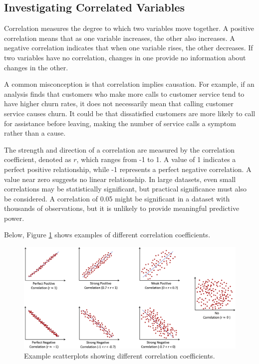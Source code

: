 \documentclass[
  11pt,
]{book}
\theoremstyle{definition}
\theoremstyle{definition}
\theoremstyle{definition}
\theoremstyle{definition}
\theoremstyle{remark}
\begin{document}
\subsection{Investigating Correlated Variables}\label{investigating-correlated-variables}

Correlation measures the degree to which two variables move together. A positive correlation means that as one variable increases, the other also increases. A negative correlation indicates that when one variable rises, the other decreases. If two variables have no correlation, changes in one provide no information about changes in the other.

A common misconception is that correlation implies causation. For example, if an analysis finds that customers who make more calls to customer service tend to have higher churn rates, it does not necessarily mean that calling customer service causes churn. It could be that dissatisfied customers are more likely to call for assistance before leaving, making the number of service calls a symptom rather than a cause.

The strength and direction of a correlation are measured by the correlation coefficient, denoted as \(r\), which ranges from -1 to 1. A value of 1 indicates a perfect positive relationship, while -1 represents a perfect negative correlation. A value near zero suggests no linear relationship. In large datasets, even small correlations may be statistically significant, but practical significance must also be considered. A correlation of 0.05 might be significant in a dataset with thousands of observations, but it is unlikely to provide meaningful predictive power.

Below, Figure \ref{fig:correlation} shows examples of different correlation coefficients.

\begin{figure}[H]

{\centering \includegraphics[width=1\linewidth]{images/ch4_correlation} 

}

\caption{Example scatterplots showing different correlation coefficients.}\label{fig:correlation}
\end{figure}
\end{document}
